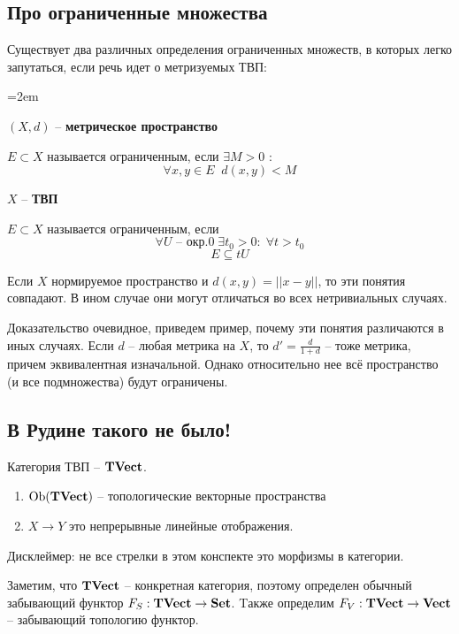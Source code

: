 \documentclass[12pt, a4paper, oneside]{book}
\begin{document}
\subsection{Про ограниченные множества}
Существует два различных определения ограниченных множеств, в которых легко запутаться, если речь идет о метризуемых ТВП:

\begin{minipage}[t]{50mm}\parindent=2em
\begin{center}
$(X,d)$ -- \textbf{метрическое пространство}
\end{center}
    $E \subset X$ называется ограниченным, если $\exists M > 0$ :\\
    $$\forall x, y \in E \; \; d(x,y) < M$$
\end{minipage}
\hfill
\begin{minipage}[t]{50mm}
\begin{center}
   $X$ -- \textbf{ТВП}
\end{center}
    $E \subset X$ называется ограниченным, если \\
    $$\forall U \text{ -- окр.} 0 \; \exists t_0 > 0 : \; \forall t > t_0 $$
$$ E \subseteq tU $$
\end{minipage}
\begin{lemma}
Если $X$ нормируемое пространство и $d(x, y) = ||x-y||$, то эти понятия совпадают. В ином случае они могут отличаться во всех нетривиальных случаях.
\end{lemma}
Доказательство очевидное, приведем пример, почему эти понятия различаются в иных случаях. Если $d$ -- любая метрика на $X$, то $d' = \frac{d}{1+d}$ -- тоже метрика,
причем эквивалентная изначальной. Однако относительно нее всё пространство (и все подмножества) будут ограничены.

\subsection{В Рудине такого не было!}
Категория ТВП -- $\textbf{TVect}$.
\begin{enumerate}
    \item $\operatorname{Ob}(\textbf{TVect})$ -- топологические векторные пространства
    \item $X \to Y$ это непрерывные линейные отображения.
\end{enumerate}
Дисклеймер: не все стрелки в этом конспекте это морфизмы в категории.

Заметим, что $\textbf{TVect}$ -- конкретная категория, поэтому определен обычный забывающий функтор $F_S:\textbf{TVect} \to \textbf{Set}$.  Tакже определим $F_V : \textbf{TVect} \to \textbf{Vect}$ -- забывающий топологию функтор.
\end{document}
